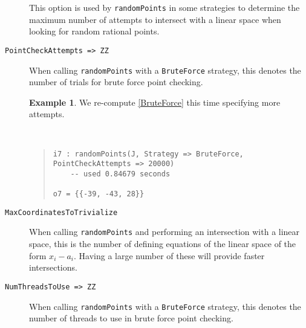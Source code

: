 \documentclass[11pt]{amsart}
\theoremstyle{definition}
\newtheorem{example}{Example}[section]
\begin{document}
\begin{description}
    This option is used by {\tt randomPoints} in some strategies to determine the maximum number of attempts to intersect with a linear space when looking for random rational points.  %

    \item[\tt PointCheckAttempts => ZZ]

    When calling {\tt randomPoints} with a {\tt BruteForce} strategy, this denotes the number of trials for brute force point checking.
    
    \begin{example}
        We re-compute \cref{BruteForce} this time specifying more attempts.
    {{\small\color{blue}
    ~~
    \begin{quote}
\begin{verbatim}    
i7 : randomPoints(J, Strategy => BruteForce, PointCheckAttempts => 20000)
    -- used 0.84679 seconds

o7 = {{-39, -43, 28}}
    \end{verbatim}%
\end{quote}%
}}%
    \end{example}%
    \vspace{-1em}
%
    \item[\tt MaxCoordinatesToTrivialize]

    When calling {\tt randomPoints} and performing an intersection with a linear space, this is the number of defining equations of the linear space of the form $x_i - a_i$.  Having a large number of these will provide faster intersections.
    
    \item[\tt NumThreadsToUse => ZZ]

    When calling {\tt randomPoints} with a {\tt BruteForce} strategy, this denotes the number of threads to use in brute force point checking.
    \end{description}
\end{document}
